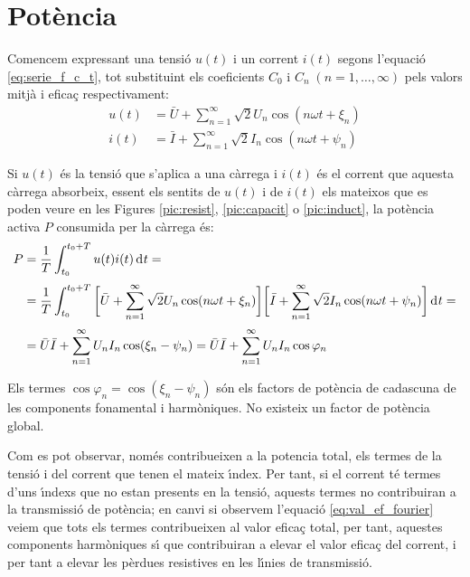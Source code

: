 \section{Pot\`{e}ncia}

Comencem expressant una tensi\'{o} $u(t)$ i un corrent $i(t)$
 segons l'equaci\'{o} \eqref{eq:serie_f_c_t}, tot substituint els
 coeficients $C_0$ i $C_n \;(n=1,\ldots,\infty)$ pels valors mitj\`{a} i efica\c{c}
 respectivament:
 \begin{align}
    u(t)  &= \bar{U} + \sum_{n=1}^\infty \sqrt{2} U_n \cos (n \omega t +
    \xi_n)\\[0.5ex]
    i(t)  &= \bar{I} + \sum_{n=1}^\infty \sqrt{2} I_n \cos (n \omega t + \psi_n)
 \end{align}

Si  $u(t)$ \'{e}s la tensi\'{o} que s'aplica a una c\`{a}rrega i $i(t)$ \'{e}s el
corrent que aquesta c\`{a}rrega absorbeix, essent els sentits de $u(t)$
i de $i(t)$ els mateixos que es poden veure en les Figures
\ref{pic:resist}, \ref{pic:capacit} o \ref{pic:induct}, la pot\`{e}ncia
activa $P$ consumida per la c\`{a}rrega \'{e}s:
\begin{equation}\begin{split}
    P &= \frac{1}{T} \int_{t_0}^{t_0+T} u(t) i(t) \diff t =
    \\[0.5ex]
     &= \frac{1}{T} \int_{t_0}^{t_0+T} \bigg[\bar{U} + \sum_{n=1}^\infty
    \sqrt{2} U_n \cos (n \omega t + \xi_n) \bigg]
    \bigg[\bar{I} + \sum_{n=1}^\infty \sqrt{2} I_n
    \cos (n \omega t + \psi_n)\bigg] \diff t=\\[0.5ex]
    &=\bar{U} \bar{I} + \sum_{n=1}^\infty U_n I_n
    \cos(\xi_n-\psi_n) = \bar{U} \bar{I} + \sum_{n=1}^\infty U_n I_n
    \cos \varphi_n \label{eq:pot_fu}
\end{split}\end{equation}

Els termes $\cos \varphi_n=\cos (\xi_n-\psi_n)$ s\'{o}n els factors de
pot\`{e}ncia de cadascuna de les components fonamental i harm\`{o}niques. No
existeix un factor de pot\`{e}ncia global.

 Com es pot observar, nom\'{e}s contribueixen a la potencia
total, els termes de la tensi\'{o} i del corrent que tenen el mateix
\'{\i}ndex. Per tant, si el corrent t\'{e} termes d'uns \'{\i}ndexs que no estan
presents en la tensi\'{o}, aquests termes no contribuiran a la
transmissi\'{o} de  pot\`{e}ncia; en canvi si observem l'equaci\'{o}
\eqref{eq:val_ef_fourier} veiem que tots els termes contribueixen al
valor efica\c{c} total, per tant, aquestes components harm\`{o}niques s\'{\i} que
contribuiran a elevar el valor efica\c{c} del corrent, i per tant a
elevar les p\`{e}rdues resistives en les l\'{\i}nies de transmissi\'{o}.

